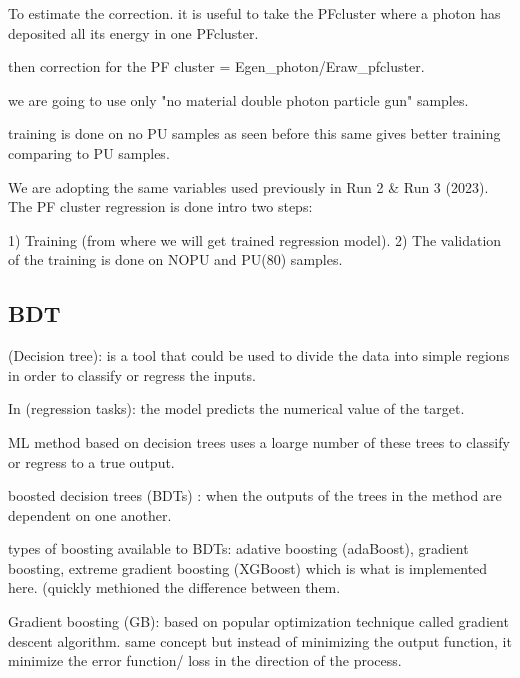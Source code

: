To estimate the correction. it is useful to take the PFcluster where a photon has deposited all its energy in one PFcluster.

then correction for the PF cluster = Egen_photon/Eraw_pfcluster.

we are going to use only "no material double photon particle gun" samples.


training is done on no PU samples as seen before this same gives better training comparing to PU samples. 


We are adopting the same variables used previously in Run 2 & Run 3 (2023). The PF cluster regression is done intro two steps:

1) Training (from where we will get trained regression model).
2) The validation of the training is done on NOPU and PU(80) samples.


\subsection{BDT}

(Decision tree): is a tool that could be used to divide the data into simple regions in order to classify or regress the inputs.

In (regression tasks): the model predicts the numerical value of the target.

ML method based on decision trees uses a loarge number of these trees to classify or regress to a true output.

boosted decision trees (BDTs) : when the outputs of the trees in the method are dependent on one another.

types of boosting available to BDTs: adative boosting (adaBoost), gradient boosting, extreme gradient boosting (XGBoost) which is what is implemented here. 
(quickly methioned the difference between them. 

Gradient boosting (GB): based on popular optimization technique called gradient descent algorithm.
same concept but instead of minimizing the output function, it minimize the error function/ loss in the direction of the process.

